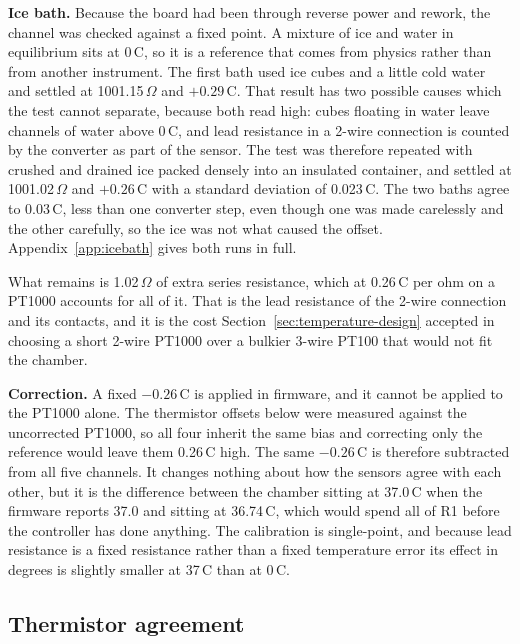\textbf{Ice bath.} Because the board had been through reverse power and rework, the channel was checked against a fixed point. A mixture of ice and water in equilibrium sits at 0\,\textdegree{}C, so it is a reference that comes from physics rather than from another instrument. The first bath used ice cubes and a little cold water and settled at 1001.15\,$\Omega$ and $+0.29$\,\textdegree{}C. That result has two possible causes which the test cannot separate, because both read high: cubes floating in water leave channels of water above 0\,\textdegree{}C, and lead resistance in a 2-wire connection is counted by the converter as part of the sensor. The test was therefore repeated with crushed and drained ice packed densely into an insulated container, and settled at 1001.02\,$\Omega$ and $+0.26$\,\textdegree{}C with a standard deviation of 0.023\,\textdegree{}C. The two baths agree to 0.03\,\textdegree{}C, less than one converter step, even though one was made carelessly and the other carefully, so the ice was not what caused the offset. Appendix~\ref{app:icebath} gives both runs in full.

What remains is 1.02\,$\Omega$ of extra series resistance, which at 0.26\,\textdegree{}C per ohm on a PT1000 accounts for all of it. That is the lead resistance of the 2-wire connection and its contacts, and it is the cost Section~\ref{sec:temperature-design} accepted in choosing a short 2-wire PT1000 over a bulkier 3-wire PT100 that would not fit the chamber.

\textbf{Correction.} A fixed $-0.26$\,\textdegree{}C is applied in firmware, and it cannot be applied to the PT1000 alone. The thermistor offsets below were measured against the uncorrected PT1000, so all four inherit the same bias and correcting only the reference would leave them 0.26\,\textdegree{}C high. The same $-0.26$\,\textdegree{}C is therefore subtracted from all five channels. It changes nothing about how the sensors agree with each other, but it is the difference between the chamber sitting at 37.0\,\textdegree{}C when the firmware reports 37.0 and sitting at 36.74\,\textdegree{}C, which would spend all of R1 before the controller has done anything. The calibration is single-point, and because lead resistance is a fixed resistance rather than a fixed temperature error its effect in degrees is slightly smaller at 37\,\textdegree{}C than at 0\,\textdegree{}C.

\subsection{Thermistor agreement}
\label{subsec:thermistor-commissioning}

